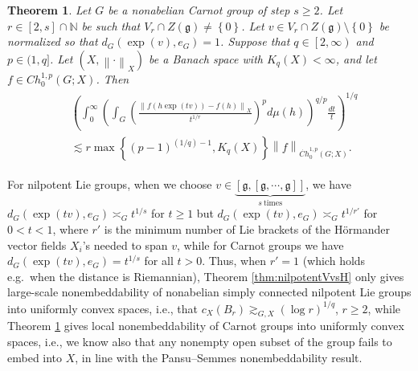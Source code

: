 \documentclass[11pt,reqno]{amsart}
\newtheorem{theorem}{Theorem}
\newcommand{\1}{\mathbf 1}
\begin{document}
\begin{theorem}\label{thm:carnotVvsH}
Let $G$ be a nonabelian Carnot group of step $s\ge 2$. Let $r\in \left[2,s\right]\cap \mathbb{N}$ be such that $V_r\cap Z\left(\mathfrak{g}\right)\neq \left\{0\right\}$. Let $v\in V_r\cap Z(\mathfrak{g})\setminus \left\{0\right\}$ be normalized so that $d_G\left(\exp\left(v\right),e_G\right)=1$. Suppose that $q\in \left[2,\infty\right)$ and $p\in (1,q]$. Let $\left(X,\left\|\cdot\right\|_X\right)$ be a Banach space with $K_q\left(X\right)<\infty$, and let $f\in Ch_0^{1,p}\left(G;X\right)$. %
Then
\begin{align}\label{eq:carnotVvsH}
\begin{aligned}
&\left(\int_0^\infty \left(\int_{G}\left(\frac{\left\|f\left(h\exp\left(tv\right)\right)-f\left(h\right)\right\|_X}{t^{1/r}}\right)^pd\mu\left(h\right)\right)^{q/p}\frac{dt}{t}\right)^{1/q}\\
&\lesssim r\max\left\{\left(p-1\right)^{(1/q)-1},K_q\left(X\right)\right\} \left\|f\right\|_{\dot{Ch}^{1,p}_0\left(G;X\right)}.
\end{aligned}
\end{align}
\end{theorem}

For nilpotent Lie groups, when we choose $v\in \underbrace{\left[\mathfrak{g},\left[\mathfrak{g},\cdots,\mathfrak{g}\right]\right]}_{s\mathrm{~times}}$, we have $d_G\left(\exp\left(tv\right),e_G\right)\asymp_G t^{1/s}$ for $t\ge 1$ but $d_G\left(\exp\left(tv\right),e_G\right)\asymp_G t^{1/r'}$ for $0<t<1$, where $r'$ is the minimum number of Lie brackets of the H\"ormander vector fields $X_i$'s needed to span $v$,
while for Carnot groups we have $d_G\left(\exp\left(tv\right),e_G\right)= t^{1/s}$ for all $t>0$. Thus, when $r'=1$ (which holds e.g.~when the distance is Riemannian), Theorem \ref{thm:nilpotentVvsH} only gives large-scale nonembeddability of nonabelian simply connected nilpotent Lie groups into uniformly convex spaces, i.e., that $c_X\left(B_r\right)\gtrsim_{G,X} \left(\log r\right)^{1/q}$, $r\ge 2$, while Theorem \ref{thm:carnotVvsH} gives local nonembeddability of Carnot groups into uniformly convex spaces, i.e., we know also that any nonempty open subset of the group fails to embed into $X$, in line with the Pansu--Semmes nonembeddability result.%
\end{document}
